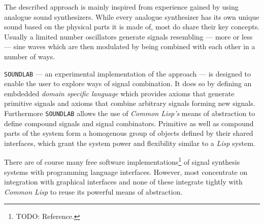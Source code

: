 The described approach is mainly inspired from experience gained by using
analogue sound synthesizers. While every analogue synthesizer has its own
unique sound based on the physical parts it is made of, most do share
their key concepts. Usually a limited number oscillators generate signals
resembling --- more or less --- sine waves which are then modulated by
being combined with each other in a number of ways.

\texttt{SOUNDLAB} --- an experimental implementation of the approach ---
is designed to enable the user to explore ways of signal combination. It
does so by defining an embdedded \textit{domain specific language} which
provides axioms that generate primitive signals and axioms that combine
arbitrary signals forming new signals. Furthermore \texttt{SOUNDLAB}
allows the use of \textit{Common Lisp's} means of abstraction to define
compound signals and signal combinators. Primitive as well as compound
parts of the system form a homogenous group of objects defined by their
shared interfaces, which grant the system power and flexibility similar
to a \textit{Lisp} system.

There are of course many free software implementations\footnote{TODO:
Reference.} of signal synthesis systems with programming language 
interfaces. However, most concentrate on integration with graphical
interfaces and none of these integrate tightly with \textit{Common Lisp}
to reuse its powerful means of abstraction.
